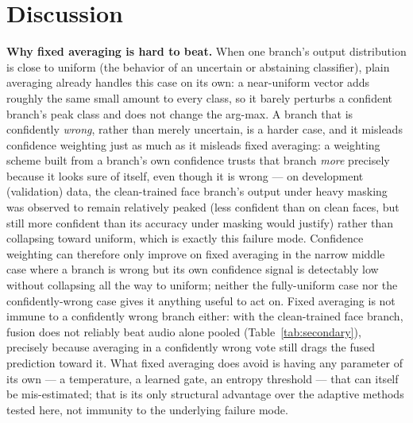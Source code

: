 \documentclass[10pt]{article}
\begin{document}
\section{Discussion}

\textbf{Why fixed averaging is hard to beat.} When one branch's output distribution is close to uniform
(the behavior of an uncertain or abstaining classifier), plain averaging already handles this case on
its own: a near-uniform vector adds roughly the same small amount to every class, so it barely perturbs
a confident branch's peak class and does not change the arg-max. A branch that is confidently
\emph{wrong}, rather than merely uncertain, is a harder case, and it misleads confidence weighting just
as much as it misleads fixed averaging: a weighting scheme built from a branch's own confidence trusts
that branch \emph{more} precisely because it looks sure of itself, even though it is wrong --- on
development (validation) data, the clean-trained face branch's output under heavy masking was observed
to remain relatively peaked (less confident than on clean faces, but still more confident than its
accuracy under masking would justify) rather than collapsing toward uniform, which is exactly this
failure mode. Confidence weighting can therefore only improve on fixed averaging in the narrow middle
case where a branch is wrong but its own confidence signal is detectably low without collapsing all the
way to uniform; neither the fully-uniform case nor the confidently-wrong case gives it anything useful
to act on. Fixed averaging is not immune to a confidently wrong branch either: with the clean-trained
face branch, fusion does not reliably beat audio alone pooled (Table~\ref{tab:secondary}), precisely
because averaging in a confidently wrong vote still drags the fused prediction toward it. What fixed
averaging does avoid is having any parameter of its own --- a temperature, a learned gate, an
entropy threshold --- that can itself be mis-estimated; that is its only structural advantage over the
adaptive methods tested here, not immunity to the underlying failure mode.
\end{document}
